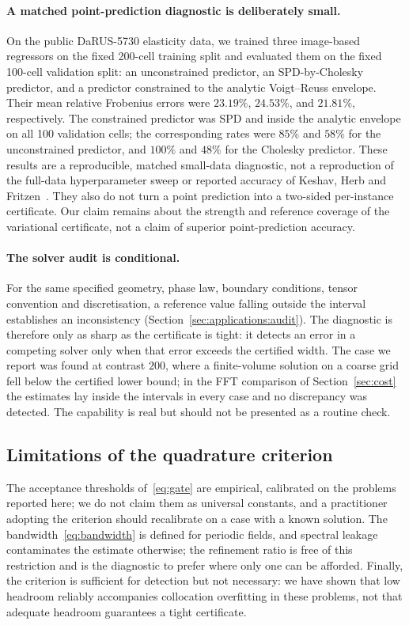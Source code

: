 \paragraph{A matched point-prediction diagnostic is deliberately small.}
On the public DaRUS-5730 elasticity data, we trained three image-based
regressors on the fixed 200-cell training split and evaluated them on the
fixed 100-cell validation split: an unconstrained predictor, an
SPD-by-Cholesky predictor, and a predictor constrained to the analytic
Voigt--Reuss envelope. Their mean relative Frobenius errors were
$23.19\%$, $24.53\%$, and $21.81\%$, respectively. The constrained
predictor was SPD and inside the analytic envelope on all 100 validation
cells; the corresponding rates were $85\%$ and $58\%$ for the
unconstrained predictor, and $100\%$ and $48\%$ for the Cholesky
predictor. These results are a reproducible, matched small-data diagnostic,
not a reproduction of the full-data hyperparameter sweep or reported
accuracy of Keshav, Herb and Fritzen~\cite{Keshav2025}. They also do not
turn a point prediction into a two-sided per-instance certificate. Our
claim remains about the strength and reference coverage of the variational
certificate, not a claim of superior point-prediction accuracy.

\paragraph{The solver audit is conditional.} For the same specified
geometry, phase law, boundary conditions, tensor convention and
discretisation, a reference value falling outside the interval establishes an
inconsistency (Section~\ref{sec:applications:audit}). The diagnostic is
therefore only as sharp as the certificate is tight: it detects an error in
a competing solver only when that error exceeds the certified width. The
case we report was found at contrast $200$, where a finite-volume solution
on a coarse grid fell below the certified lower bound; in the FFT
comparison of Section~\ref{sec:cost} the estimates lay inside the intervals
in every case and no discrepancy was detected. The capability is real but
should not be presented as a routine check.

\subsection{Limitations of the quadrature criterion}

The acceptance thresholds of~\eqref{eq:gate} are empirical, calibrated on
the problems reported here; we do not claim them as universal constants,
and a practitioner adopting the criterion should recalibrate on a case with
a known solution. The bandwidth~\eqref{eq:bandwidth} is defined for
periodic fields, and spectral leakage contaminates the estimate otherwise;
the refinement ratio is free of this restriction and is the diagnostic to
prefer where only one can be afforded. Finally, the criterion is
sufficient for detection but not necessary: we have shown that low headroom
reliably accompanies collocation overfitting in these problems, not that
adequate headroom guarantees a tight certificate.

